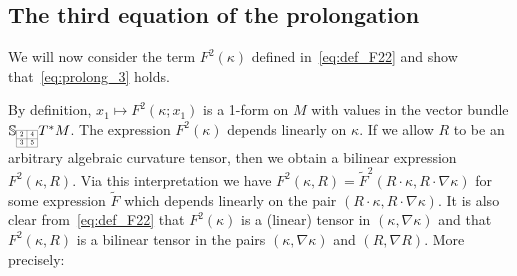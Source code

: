 \documentclass[11pt,a4paper]{article}
\theoremstyle{plain}
\theoremstyle{remark}
\newcommand{\bbS}{\mathbb{S}}
\begin{document}
\subsection{The third equation of the prolongation}
We will now consider the term $F^{2}(\kappa)$ defined in~\eqref{eq:def_F22} and show that~\eqref{eq:prolong_3} holds.

By definition, $x_1\mapsto F^2(\kappa;x_1)$ is a 1-form on $M$ with values in
the vector bundle $\bbS_{\scaleto{\begin{array}{|c|c|c|}
\cline{1-2}
2 & 4 \\
\cline{1-2}
3 & 5 \\
\cline{1-2}
\end{array}}{12pt}}T^*M$. The expression $F^2(\kappa)$ depends
linearly on $\kappa$. If we allow $R$ to be an arbitrary algebraic curvature
tensor, then we obtain a bilinear expression $F^2(\kappa,R)$. Via this
interpretation we have $F^2(\kappa,R) = \tilde
F^2(R\cdot\kappa,R\cdot\nabla\kappa)$ for some expression $\tilde F$ which depends linearly on the pair
$(R\cdot\kappa,R\cdot\nabla\kappa)$.
It is also clear from~\eqref{eq:def_F22} that $F^2(\kappa)$ is a (linear) tensor in 
$(\kappa,\nabla\kappa)$ and that $F^2(\kappa,R)$ is a bilinear tensor 
in the pairs $(\kappa,\nabla\kappa)$ and $(R,\nabla R)$. More precisely:
\end{document}
